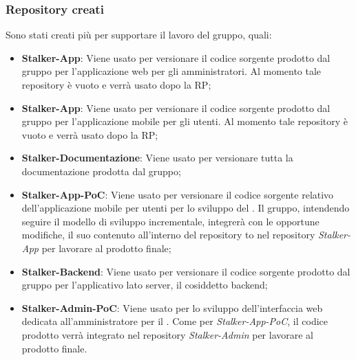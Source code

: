 \subsubsection{Repository creati}
Sono stati creati più  per supportare il lavoro del gruppo, quali:
\begin{itemize}
	\item \textbf{Stalker-App}: Viene usato per versionare il codice sorgente prodotto dal gruppo per l'applicazione web per gli amministratori. Al momento tale repository è vuoto e verrà usato dopo la RP;
	\item \textbf{Stalker-App}: Viene usato per versionare il codice sorgente prodotto dal gruppo per l'applicazione mobile per gli utenti. Al momento tale repository è vuoto e verrà usato dopo la RP;
	\item \textbf{Stalker-Documentazione}: Viene usato per versionare tutta la documentazione prodotta dal gruppo;
	\item \textbf{Stalker-App-PoC}: Viene usato per versionare il codice sorgente relativo dell'applicazione mobile per utenti per lo sviluppo del .
	Il gruppo, intendendo seguire il modello di sviluppo incrementale, integrerà con le opportune modifiche, il suo contenuto all'interno del repository to nel repository \textit{Stalker-App} per lavorare al prodotto finale;
	\item \textbf{Stalker-Backend}: Viene usato per versionare il codice sorgente prodotto dal gruppo per l'applicativo lato server, il cosiddetto backend;
	\item \textbf{Stalker-Admin-PoC}: Viene usato per lo sviluppo dell'interfaccia web dedicata all'amministratore per il .
	Come per \textit{Stalker-App-PoC}, il codice prodotto verrà integrato nel repository \textit{Stalker-Admin} per lavorare al prodotto finale.
\end{itemize}

